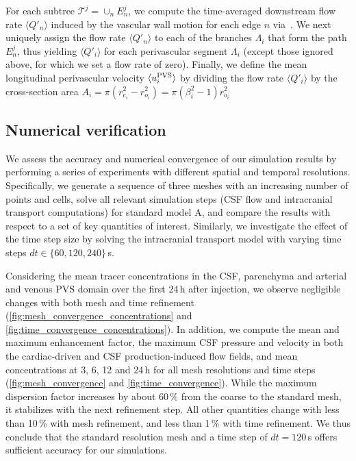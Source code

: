For each subtree $\mathcal{T}^j = \cup_n E_n^j$, we compute the
time-averaged downstream flow rate $\langle Q'_n \rangle$ induced by
the vascular wall motion for each edge $n$ via~\cite[eq.~(5),
  (34)]{gjerde2023directional}. We next uniquely assign the flow rate
$\langle Q'_n \rangle$ to each of the branches $\Lambda_i$ that form
the path $E_n^j$, thus yielding $\langle Q'_i \rangle$ for each
perivascular segment $\Lambda_i$ (except those ignored above, for
which we set a flow rate of zero). Finally, we define the mean
longitudinal perivascular velocity $\langle u^{\rm PVS}_i \rangle$ by
dividing the flow rate $\langle Q'_i \rangle$ by the cross-section
area $A_i = \pi (r_{e_i}^2 - r_{o_i}^2) = \pi (\beta_i^2 - 1) r_{o_i}^2$

\subsection{Numerical verification}

We assess the accuracy and numerical convergence of our simulation results by performing a series of experiments with different spatial and temporal resolutions. Specifically, we generate a sequence of three meshes with an increasing number of points and cells, solve all relevant simulation steps (CSF flow and intracranial transport computations) for standard model A, and compare the results with respect to a set of key quantities of interest. Similarly, we investigate the effect of the time step size by solving the intracranial transport model with varying time steps $dt \in \{60, 120, 240 \}$\,s.

Considering the mean tracer concentrations in the CSF, parenchyma and arterial and venous PVS domain over the first 24\,h after injection, we observe negligible changes with both mesh and time refinement (\cref{fig:mesh_convergence_concentrations} and 
\ref{fig:time_convergence_concentrations}). In addition, we compute the mean and maximum enhancement factor, the maximum CSF pressure and velocity in both the cardiac-driven and CSF production-induced flow fields, and mean concentrations at 3, 6, 12 and 24\,h for all mesh resolutions and time steps (\cref{fig:mesh_convergence} and \cref{fig:time_convergence}). While the maximum dispersion factor increases by about 60\,\% from the coarse to the standard mesh, it stabilizes with the next refinement step. All other quantities change with less than 10\,\% with mesh refinement, and less than 1\,\% with time refinement. We thus conclude that the standard resolution mesh and a time step of $dt=120\,$s offers sufficient accuracy for our simulations.


